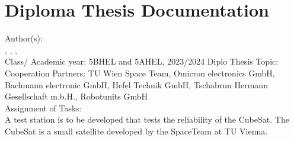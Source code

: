 
{\raggedright
\section{Diploma Thesis Documentation}
\vspace{3mm}
 Author(s):\\
 \nameSH, \nameJS, \nameCZ, \nameSB\\ 
\vspace{3mm}
 Class/ Academic year: 5BHEL and 5AHEL, 2023/2024
\vspace{3mm}
 Diplo Thesis Topic: \Thema\\
\vspace{3mm}
 Cooperation Partners: TU Wien Space Team\autocite{TU_Wien_Spaceteam}, Omicron electronics GmbH\autocite{OMICRON_electronics_GmbH}, Bachmann electronic GmbH\autocite{Bachmann_electronic_GmbH}, Hefel Technik GmbH\autocite{Hefel_Technik_GmbH}, Tschabrun Hermann Gesellschaft m.b.H.\autocite{Tschabrun_Hermann_Gesellschaft}, Robotunits GmbH\autocite{robogmbh}\\
\vspace{3mm}
 Assignment of Tasks:\\
 A test station is to be developed that tests the reliability of the CubeSat. The CubeSat is a small satellite developed by the SpaceTeam at TU Vienna.\\    
}
